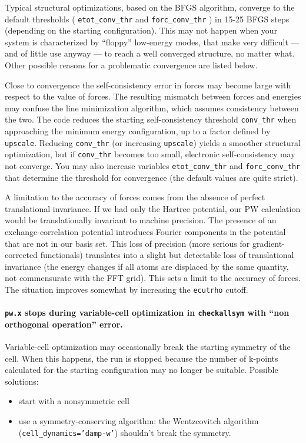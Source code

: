 \documentclass[12pt,a4paper]{article}
\begin{document}
Typical structural optimizations, based on the BFGS algorithm, converge to 
the default thresholds ( \texttt{etot\_conv\_thr} and 
\texttt{forc\_conv\_thr} ) in 15-25 BFGS steps (depending on the starting 
configuration). This may not happen when your system is characterized by 
``floppy'' low-energy modes, that make very difficult --- and of little use 
anyway --- to reach a well converged structure, no matter what.  Other 
possible reasons for a problematic convergence are listed below.

Close to convergence the self-consistency error in forces may become
large with respect to the value of forces.  The resulting mismatch
between forces and energies may confuse the line minimization
algorithm, which assumes consistency between the two.  The code
reduces the starting self-consistency threshold
\texttt{conv\_thr} when approaching the minimum energy configuration,
up to a factor defined by \texttt{upscale}.  Reducing
\texttt{conv\_thr} (or increasing \texttt{upscale}) yields a smoother
structural optimization, but if \texttt{conv\_thr} becomes too small,
electronic self-consistency may not converge.  You may also increase
variables \texttt{etot\_conv\_thr} and
\texttt{forc\_conv\_thr} that determine the threshold for convergence
(the default values are quite strict).

A limitation to the accuracy of forces comes from the absence of
perfect translational invariance.  If we had only the Hartree
potential, our PW calculation would be translationally invariant to
machine precision.  The presence of an exchange-correlation potential
introduces Fourier components in the potential that are not in our
basis set.  This loss of precision (more serious for
gradient-corrected functionals) translates into a slight but
detectable loss of translational invariance (the energy changes if all
atoms are displaced by the same quantity, not commensurate with the
FFT grid).  This sets a limit to the accuracy of forces.  The
situation improves somewhat by increasing the \texttt{ecutrho} cutoff.

\paragraph{\texttt{pw.x} stops during variable-cell optimization
in \texttt{checkallsym} with ``non orthogonal operation'' error.}

Variable-cell optimization may occasionally break the starting
symmetry of the cell. When this happens, the run is stopped
because the number of k-points calculated for the starting
configuration may no longer be suitable. Possible solutions:
\begin{itemize}
\item start with a nonsymmetric cell
\item use a symmetry-conserving algorithm: the Wentzcovitch
algorithm \\
(\texttt{cell\_dynamics='damp-w'}) shouldn't break the symmetry.
\end{itemize}
\end{document}
